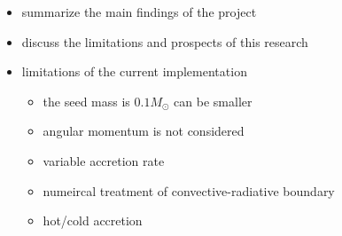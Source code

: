 \documentclass[12pt,a4paper]{article}
\newenvironment{outline}[1]{%
  \begin{itemize}[label=\textbullet]%
  \color{#1}%
}{%
  \end{itemize}%
}
\begin{document}
\begin{outline}{gray}
  \item summarize the main findings of the project
  \item discuss the limitations and prospects of this research
  \item limitations of the current implementation
  \begin{itemize}
    \item the seed mass is $0.1 M_\odot$ can be smaller
    \item angular momentum is not considered
    \item variable accretion rate
    \item numeircal treatment of convective-radiative boundary
    \item hot/cold accretion
  \end{itemize}
\end{outline}




\newpage
\printbibliography[heading=bibintoc, title={References}]
\end{document}
